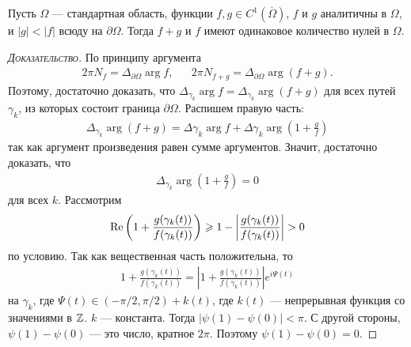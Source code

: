 \documentclass[../complex-analysis.tex]{subfiles}
\begin{document}
\begin{thm}[Руше]
 Пусть $ \Omega $ --- стандартная область, функции $ f,g \in C^{1}(\overline\Omega) $, $ f $ и $ g $ аналитичны в $ \Omega $, и $ \left| g \right| < \left| f \right| $ всюду на $ \partial \Omega $. Тогда $ f + g $ и $ f $ имеют одинаковое количество нулей в $ \Omega $.
\end{thm}
\begin{proof}[\normalfont\textsc{Доказательство}]
 По принципу аргумента
 \begin{align*} 2\pi N_f = \Delta_{\partial\Omega} \arg f, && 2\pi N_{f+g} = \Delta_{\partial\Omega}\arg(f+g).
 \end{align*} Поэтому, достаточно доказать, что $ \Delta_{\gamma_k} \arg f = \Delta_{\gamma_k} \arg (f+g) $ для всех путей $ \gamma_k $, из которых состоит граница $ \partial\Omega $. Распишем правую часть:
 \begin{align*}
  \Delta_{\gamma_k} \arg (f+g)  = \Delta{\gamma_k} \arg f + \Delta{\gamma_k} \arg \left( 1 + \frac{g}{f}\right)
 \end{align*} так как аргумент произведения равен сумме аргументов. Значит, достаточно доказать, что
 \begin{align*}
  \Delta_{\gamma_k} \arg \left( 1 + \frac{g}{f} \right) = 0
 \end{align*} для всех $ k $. Рассмотрим 
 \begin{align*}
  \operatorname{Re} \left(1 + \frac{g(\gamma_k(t))}{f(\gamma_k(t))}\right) \geqslant 1 - \left| \frac{g(\gamma_k(t))}{f(\gamma_k(t))} \right| > 0
 \end{align*} по условию. Так как вещественная часть положительна, то
 \begin{align*}
  1 + \frac{g(\gamma_k(t))}{f(\gamma_k(t))} = \left| 1 + \frac{g(\gamma_k(t))}{f(\gamma_k(t))} \right|e^{i\Psi(t)}
 \end{align*} на $ \gamma_k $, где $ \Psi(t) \in (-\pi / 2, \pi / 2) + k(t)  $, где $ k(t) $ --- непрерывная функция со значениями в $ \mathbb{Z} $. $ k $ --- константа. Тогда $ \left|\psi(1) - \psi(0) \right| < \pi $. С другой стороны, $ \psi(1) - \psi(0) $ --- это число, кратное $ 2\pi $. Поэтому $ \psi(1) - \psi(0) = 0 $.
\end{proof}
\end{document}
